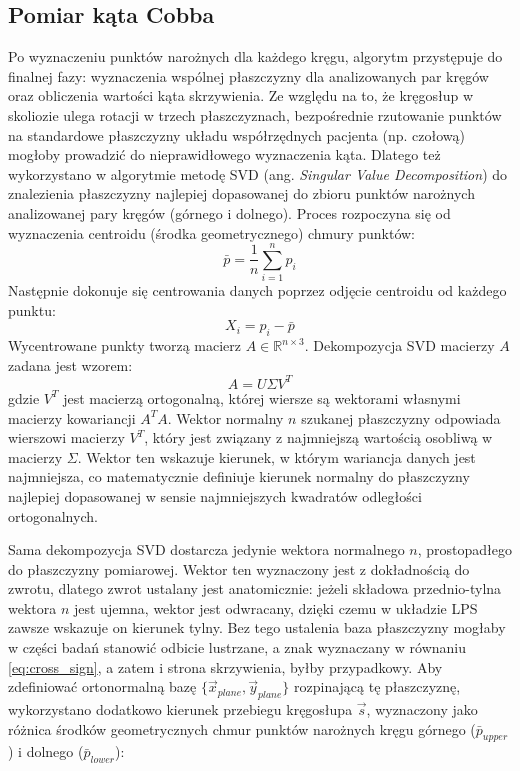 \subsection{Pomiar kąta Cobba}
\label{subsec:cobb}
Po wyznaczeniu punktów narożnych dla każdego kręgu, algorytm przystępuje do finalnej fazy: wyznaczenia wspólnej płaszczyzny dla analizowanych par kręgów oraz obliczenia wartości kąta skrzywienia.
Ze względu na to, że kręgosłup w skoliozie ulega rotacji w trzech płaszczyznach, bezpośrednie rzutowanie punktów na standardowe płaszczyzny układu współrzędnych pacjenta (np. czołową) mogłoby prowadzić do nieprawidłowego wyznaczenia kąta.
Dlatego też wykorzystano w algorytmie metodę SVD (ang. \textit{Singular Value Decomposition}) do znalezienia płaszczyzny najlepiej dopasowanej do zbioru punktów narożnych analizowanej pary kręgów (górnego i dolnego).
Proces rozpoczyna się od wyznaczenia centroidu (środka geometrycznego) chmury punktów:
\begin{equation}
    \bar{p} = \frac{1}{n} \sum_{i=1}^{n} p_i
\end{equation}
Następnie dokonuje się centrowania danych poprzez odjęcie centroidu od każdego punktu:
\begin{equation}
    X_i = p_i - \bar{p}
\end{equation}
Wycentrowane punkty tworzą macierz $A \in \mathbb{R}^{n\times3}$.
Dekompozycja SVD macierzy $A$ zadana jest wzorem:
\begin{equation}
    A = U \Sigma V^T
\end{equation}
gdzie $V^T$ jest macierzą ortogonalną, której wiersze są wektorami własnymi macierzy kowariancji $A^{T}A$.
Wektor normalny $n$ szukanej płaszczyzny odpowiada wierszowi macierzy $V^T$, który jest związany z najmniejszą wartością osobliwą w macierzy $\Sigma$.
Wektor ten wskazuje kierunek, w którym wariancja danych jest najmniejsza, co matematycznie definiuje kierunek normalny do płaszczyzny najlepiej dopasowanej w sensie najmniejszych kwadratów odległości ortogonalnych.

Sama dekompozycja SVD dostarcza jedynie wektora normalnego $n$, prostopadłego do płaszczyzny pomiarowej.
Wektor ten wyznaczony jest z dokładnością do zwrotu, dlatego zwrot ustalany jest anatomicznie: jeżeli składowa przednio-tylna wektora $n$ jest ujemna, wektor jest odwracany, dzięki czemu w układzie LPS zawsze wskazuje on kierunek tylny.
Bez tego ustalenia baza płaszczyzny mogłaby w części badań stanowić odbicie lustrzane, a znak wyznaczany w równaniu \eqref{eq:cross_sign}, a zatem i strona skrzywienia, byłby przypadkowy.
Aby zdefiniować ortonormalną bazę $\{\vec{x}_{plane}, \vec{y}_{plane}\}$ rozpinającą tę płaszczyznę, wykorzystano dodatkowo kierunek przebiegu kręgosłupa $\vec{s}$, wyznaczony jako różnica środków geometrycznych chmur punktów narożnych kręgu górnego ($\bar{p}_{upper}$) i dolnego ($\bar{p}_{lower}$):

